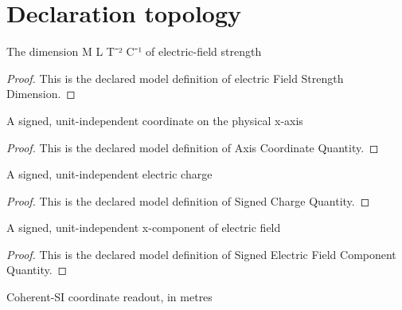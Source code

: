 \section{Declaration topology}
\begin{definition}
  \label{def:physics:phyx-mini-0861:phyxminiproblems-problemphyxmini0861-electricfieldstrengthdimension}
  The dimension M L T⁻² C⁻¹ of electric-field strength
\end{definition}
\begin{proof}
  This is the declared model definition of electric Field Strength Dimension.
\end{proof}
\begin{definition}
  \label{def:physics:phyx-mini-0861:phyxminiproblems-problemphyxmini0861-axiscoordinatequantity}
  A signed, unit-independent coordinate on the physical x-axis
\end{definition}
\begin{proof}
  This is the declared model definition of Axis Coordinate Quantity.
\end{proof}
\begin{definition}
  \label{def:physics:phyx-mini-0861:phyxminiproblems-problemphyxmini0861-signedchargequantity}
  A signed, unit-independent electric charge
\end{definition}
\begin{proof}
  This is the declared model definition of Signed Charge Quantity.
\end{proof}
\begin{definition}
  \label{def:physics:phyx-mini-0861:phyxminiproblems-problemphyxmini0861-signedelectricfieldcomponentquantity}
  A signed, unit-independent x-component of electric field
\end{definition}
\begin{proof}
  This is the declared model definition of Signed Electric Field Component Quantity.
\end{proof}
\begin{definition}
  \label{def:physics:phyx-mini-0861:phyxminiproblems-problemphyxmini0861-axiscoordinateinmeters}
  Coherent-SI coordinate readout, in metres
\end{definition}
